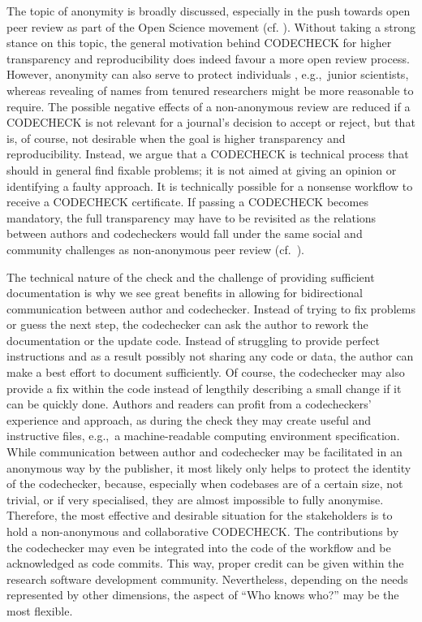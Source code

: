 \documentclass[12pt]{article}
\begin{document}
The topic of anonymity is broadly discussed, especially in the push towards
open peer review as part of the Open Science movement 
(cf. \cite{ross-hellauer_guidelines_2019}).
Without taking a strong stance on this topic, the general motivation 
behind CODECHECK
for higher transparency and reproducibility does indeed favour a more open 
review process.
However, anonymity can also serve to protect individuals \cite{tennant_limitations_2020}, e.g.,~junior scientists, whereas revealing of names from tenured researchers might be more reasonable to require.
The possible negative effects of a non-anonymous review are reduced if a CODECHECK is not relevant for a journal's decision to accept or reject, but that is, of course, not desirable when the goal is higher transparency and reproducibility.
Instead, we argue that a CODECHECK is technical process that should in general find fixable problems; it is not aimed at giving an opinion or identifying a faulty approach.
It is technically possible for a nonsense workflow to receive
a CODECHECK certificate.
If passing a CODECHECK becomes mandatory, the full transparency may have to be 
revisited as the relations between authors and codecheckers would fall under the
same social and community challenges as non-anonymous peer review
(cf.~\cite{everythinghertz123}).

The technical nature of the check and the challenge of providing sufficient documentation is why we see great benefits in allowing for bidirectional communication between author and codechecker.
Instead of trying to
fix problems or guess the next step, the codechecker can ask the author to 
rework the documentation or the update code.
Instead of struggling to provide perfect instructions and as a result possibly not sharing any code or data, the author can make a best effort to document sufficiently.
Of course, the codechecker may also provide a fix within the code instead
of lengthily describing a small change if it can be quickly done.
Authors and readers can profit from a codecheckers' experience and approach, as during the check they may create useful and instructive files, e.g.,~a machine-readable computing environment specification.
While communication between author and codechecker may be facilitated in an 
anonymous way by the 
publisher, it most likely only helps to protect the identity of the codechecker, because, especially when codebases are of a certain size, not trivial, or if very specialised, they are almost impossible to fully anonymise.
Therefore, the most effective and desirable situation for the stakeholders is to hold a non-anonymous and collaborative CODECHECK.
The contributions by the codechecker may even be integrated into
the code of the workflow and be acknowledged as code commits. This way, 
proper credit can be given within the research software development community.
Nevertheless, depending on the needs represented by other dimensions,
the aspect of ``Who knows who?'' may be the most flexible.
\end{document}

